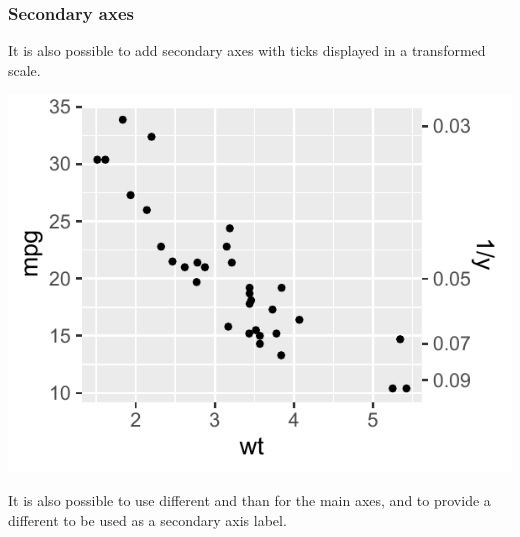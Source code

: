 \documentclass[krantz2]{krantz}\usepackage{knitr}
\begin{document}
\subsubsection{Secondary axes}

It is also possible to add secondary axes with ticks displayed in a transformed scale.

\begin{knitrout}\footnotesize
{}\color{fgcolor}\begin{kframe}
\begin{alltt}
\hlstd{(}   \hlopt{+}
  \hlstd{()} \hlopt{+}
  \hlstd{(} \hlstd{=} \hlstd{(}\hlopt{~}  \hlopt{^-}\hlstd{,}  \hlstd{=} \hlstd{) )}
\end{alltt}
\end{kframe}

{\centering \includegraphics[width=.54\textwidth]{figure/pos-axis-secondary-01-1} 

}


\end{knitrout}

It is also possible to use different  and  than for the main axes, and to provide a different  to be used as a secondary axis label.

\begin{knitrout}\footnotesize
{}\color{fgcolor}\begin{kframe}
\begin{alltt}
  \hlstd{(} \hlstd{=} \hlstd{(}\hlopt{~}  \hlopt{/} \hlstd{,}  \hlstd{=}  \hlopt{/} 
                                          \hlstd{=} \hlstd{(}\hlstd{,} \hlstd{,} \hlstd{,} \hlstd{)))}
\end{alltt}
\end{kframe}
\end{knitrout}
\end{document}
